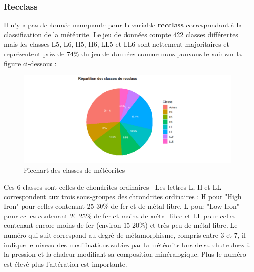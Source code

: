 \documentclass[12pt]{article}
\begin{document}
\subsubsection*{Recclass}
Il n'y a pas de donnée manquante pour la variable \textbf{recclass} correspondant à la classification de la météorite. Le jeu de données compte 422 classes différentes mais les classes L5, L6, H5, H6, LL5 et LL6 sont nettement majoritaires et représentent près de 74\% du jeu de données comme nous pouvons le voir sur la figure ci-dessous :
\begin{figure}[H]
\centering
\includegraphics[width=17cm]{Images/exploration/recclass_piechart_class.png}
\caption{Piechart des classes de météorites}
\end{figure}
Ces 6 classes sont celles de chondrites ordinaires \cite{Classification_meteorites}. Les lettres L, H et LL correspondent aux trois sous-groupes des chrondrites ordinaires : H pour "High Iron" pour celles contenant 25-30\% de fer et de métal libre, L pour "Low Iron" pour celles contenant 20-25\% de fer et moins de métal libre et LL pour celles contenant encore moins de fer (environ 15-20\%) et très peu de métal libre. Le numéro qui suit correspond au degré de métamorphisme, compris entre 3 et 7, il indique le niveau des modifications subies par la météorite lors de sa chute dues à la pression et la chaleur modifiant sa composition minéralogique. Plus le numéro est élevé plus l'altération est importante.
\end{document}
